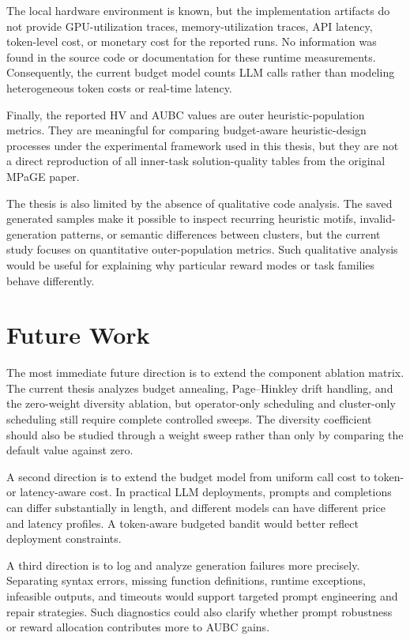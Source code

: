 The local hardware environment is known, but the implementation artifacts do not provide GPU-utilization traces, memory-utilization traces, API latency, token-level cost, or monetary cost for the reported runs. No information was found in the source code or documentation for these runtime measurements. Consequently, the current budget model counts LLM calls rather than modeling heterogeneous token costs or real-time latency.

Finally, the reported HV and AUBC values are outer heuristic-population metrics. They are meaningful for comparing budget-aware heuristic-design processes under the experimental framework used in this thesis, but they are not a direct reproduction of all inner-task solution-quality tables from the original MPaGE paper.

The thesis is also limited by the absence of qualitative code analysis. The saved generated samples make it possible to inspect recurring heuristic motifs, invalid-generation patterns, or semantic differences between clusters, but the current study focuses on quantitative outer-population metrics. Such qualitative analysis would be useful for explaining why particular reward modes or task families behave differently.

\section{Future Work}

The most immediate future direction is to extend the component ablation matrix. The current thesis analyzes budget annealing, Page--Hinkley drift handling, and the zero-weight diversity ablation, but operator-only scheduling and cluster-only scheduling still require complete controlled sweeps. The diversity coefficient should also be studied through a weight sweep rather than only by comparing the default value against zero.

A second direction is to extend the budget model from uniform call cost to token- or latency-aware cost. In practical LLM deployments, prompts and completions can differ substantially in length, and different models can have different price and latency profiles. A token-aware budgeted bandit would better reflect deployment constraints.

A third direction is to log and analyze generation failures more precisely. Separating syntax errors, missing function definitions, runtime exceptions, infeasible outputs, and timeouts would support targeted prompt engineering and repair strategies. Such diagnostics could also clarify whether prompt robustness or reward allocation contributes more to AUBC gains.

